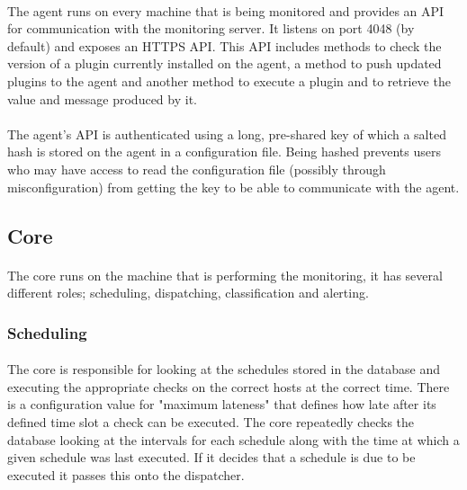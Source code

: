 \documentclass[bsc,logo,twoside]{infthesis}
\begin{document}
\paragraph*{}
	The agent runs on every machine that is being monitored and provides an API for
	communication with the monitoring server.  It listens on port 4048 (by default)
	and exposes an HTTPS API.  This API includes methods to check the version of a
	plugin currently installed on the agent, a method to push updated plugins to
	the agent and another method to execute a plugin and to retrieve the value and
	message produced by it.

\paragraph*{}
	The agent's API is authenticated using a long, pre-shared key of which a salted
	hash is stored on the agent in a configuration file.  Being hashed prevents
	users who may have access to read the configuration file (possibly through
	misconfiguration) from getting the key to be able to communicate with the
	agent.

\subsection{Core}
\paragraph*{}
	The core runs on the machine that is performing the monitoring, it has several
	different roles; scheduling, dispatching, classification and alerting.

\subsubsection{Scheduling}
\paragraph*{}
	The core is responsible for looking at the schedules stored in the database and
	executing the appropriate checks on the correct hosts at the correct time.
	There is a configuration value for "maximum lateness" that defines how late
	after its defined time slot a check can be executed.  The core repeatedly
	checks the database looking at the intervals for each schedule along with the
	time at which a given schedule was last executed.  If it decides that a
	schedule is due to be executed it passes this onto the dispatcher.
\end{document}
